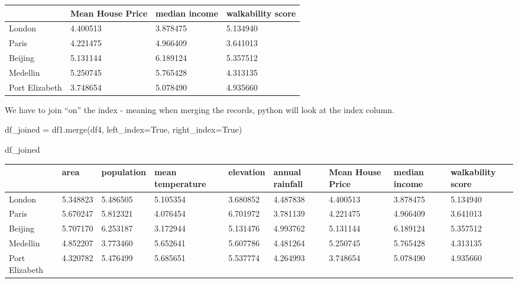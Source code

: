 \documentclass[
  letterpaper,
  DIV=11,
  numbers=noendperiod]{scrreprt}
\newenvironment{Shaded}{\begin{snugshade}}{\end{snugshade}}
\newcommand{\NormalTok}[1]{\textcolor[rgb]{0.00,0.23,0.31}{#1}}
\newcommand{\OperatorTok}[1]{\textcolor[rgb]{0.37,0.37,0.37}{#1}}
\newcommand{\VariableTok}[1]{\textcolor[rgb]{0.07,0.07,0.07}{#1}}
\begin{document}
\begin{longtable}[]{@{}llll@{}}
\toprule()
& Mean House Price & median income & walkability score \\
\midrule()
\endhead
London & 4.400513 & 3.878475 & 5.134940 \\
Paris & 4.221475 & 4.966409 & 3.641013 \\
Beijing & 5.131144 & 6.189124 & 5.357512 \\
Medellin & 5.250745 & 5.765428 & 4.313135 \\
Port Elizabeth & 3.748654 & 5.078490 & 4.935660 \\
\bottomrule()
\end{longtable}

We have to join ``on'' the index - meaning when merging the records,
python will look at the index column.

\begin{Shaded}
\begin{Highlighting}[]
\NormalTok{df\_joined }\OperatorTok{=}\NormalTok{ df1.merge(df4, left\_index}\OperatorTok{=}\VariableTok{True}\NormalTok{, right\_index}\OperatorTok{=}\VariableTok{True}\NormalTok{)}
\end{Highlighting}
\end{Shaded}

\begin{Shaded}
\begin{Highlighting}[]
\NormalTok{df\_joined}
\end{Highlighting}
\end{Shaded}

\begin{longtable}[]{@{}lllllllll@{}}
\toprule()
& area & population & mean temperature & elevation & annual rainfall &
Mean House Price & median income & walkability score \\
\midrule()
\endhead
London & 5.348823 & 5.486505 & 5.105354 & 3.680852 & 4.487838 & 4.400513
& 3.878475 & 5.134940 \\
Paris & 5.670247 & 5.812321 & 4.076454 & 6.701972 & 3.781139 & 4.221475
& 4.966409 & 3.641013 \\
Beijing & 5.707170 & 6.253187 & 3.172944 & 5.131476 & 4.993762 &
5.131144 & 6.189124 & 5.357512 \\
Medellin & 4.852207 & 3.773460 & 5.652641 & 5.607786 & 4.481264 &
5.250745 & 5.765428 & 4.313135 \\
Port Elizabeth & 4.320782 & 5.476499 & 5.685651 & 5.537774 & 4.264993 &
3.748654 & 5.078490 & 4.935660 \\
\bottomrule()
\end{longtable}
\end{document}
